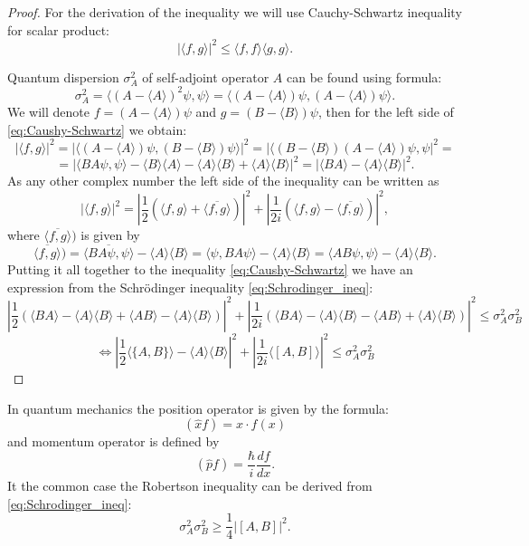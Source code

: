 \documentclass[11pt]{article}
\begin{document}
\begin{proof}
For the derivation of the inequality we will use Cauchy-Schwartz inequality for scalar product:
\begin{equation}
|\langle f, g\rangle |^2 \leq \langle f, f\rangle \langle g, g\rangle. \label{eq:Caushy-Schwartz}
\end{equation}

Quantum dispersion $\sigma^2_A$ of self-adjoint operator $A$ can be found using formula:
\[
\sigma_A^2 = \langle (A - \langle A\rangle)^2\psi, \psi\rangle = \langle  (A - \langle A\rangle)\psi,  (A - \langle A\rangle)\psi\rangle.
\]
We will denote $f = (A - \langle A\rangle)\psi$ and $g = (B - \langle B\rangle)\psi$, then for the left side of \eqref{eq:Caushy-Schwartz} we obtain:
\[
|\langle f, g\rangle |^2 = |\langle (A - \langle A\rangle)\psi, (B - \langle B\rangle)\psi\rangle |^2 = |\langle (B - \langle B\rangle)(A - \langle A\rangle)\psi, \psi |^2 = 
\]
\[
= | \langle BA\psi, \psi\rangle - \langle B\rangle\langle A\rangle - \langle A\rangle \langle B\rangle + \langle A\rangle\langle B\rangle |^2 = | \langle BA\rangle - \langle A\rangle\langle B\rangle |^2.
\]
As any other complex number the left side of the inequality can be written as
\[
|\langle f, g\rangle |^2 = \left| \frac{1}{2}(\langle f, g\rangle + \overline{\langle f, g\rangle})\right|^2 + \left| \frac{1}{2i}(\langle f, g\rangle - \overline{\langle f, g\rangle})\right|^2, 
\]
where $\overline{\langle f, g\rangle})$ is given by
\[
\overline{\langle f, g\rangle}) = \overline{\langle BA\psi, \psi\rangle} - \langle A\rangle\langle B\rangle = \langle\psi, BA\psi\rangle - \langle A\rangle\langle B\rangle = \langle AB\psi, \psi\rangle - \langle A\rangle\langle B\rangle.
\]
Putting it all together to the inequality \eqref{eq:Caushy-Schwartz} we have an expression from the Schr\"{o}dinger inequality \eqref{eq:Schrodinger_ineq}:
\[
\left| \frac{1}{2}(\langle BA\rangle - \langle A\rangle\langle B\rangle + \langle AB\rangle - \langle A\rangle\langle B\rangle)\right|^2 + \left| \frac{1}{2i}(\langle BA\rangle - \langle A\rangle\langle B\rangle - \langle AB\rangle + \langle A\rangle\langle B\rangle)\right|^2 \leq \sigma_A^2\sigma_B^2
\]
\[
\Leftrightarrow \left| \frac{1}{2}\langle\{A, B\}\rangle - \langle A\rangle\langle B\rangle \right|^2 + \left| \frac{1}{2i}\langle [A, B]\rangle\right|^2 \leq \sigma_A^2\sigma_B^2
\]
\end{proof}

In quantum mechanics the position operator is given by the formula:
\[
(\hat{x}f) = x\cdot f(x)
\]
and momentum operator is defined by
\[
(\hat{p}f) = \frac{\hbar}{i}\frac{df}{dx}.
\]
It the common case the Robertson inequality can be derived from \eqref{eq:Schrodinger_ineq}:
\[
\sigma_A^2\sigma_B^2 \geq \frac{1}{4}|[A, B]|^2.
\]
\end{document}
